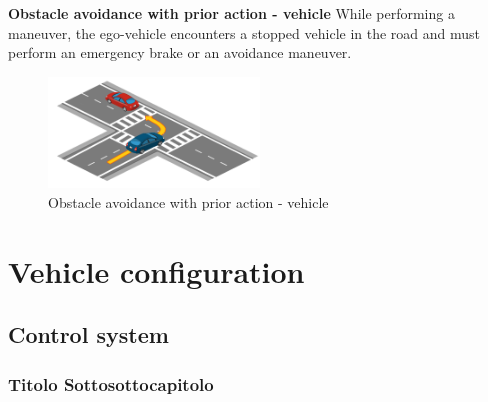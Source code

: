 \documentclass{article}
\begin{document}
\textbf{Obstacle avoidance with prior action - vehicle} 
While performing a maneuver, the ego-vehicle encounters a stopped vehicle in the road and must perform an emergency brake or an avoidance maneuver.
\begin{figure}[h]
    \centering
    \includegraphics[width=0.5\textwidth]{img/TR19a.png}
    \caption{Obstacle avoidance with prior action - vehicle} \label{Scenario_obsAvoidanceWithoutVehicle}
\end{figure}

\section{Vehicle configuration}

\subsection{Control system}


\subsubsection{Titolo Sottosottocapitolo}
\end{document}
